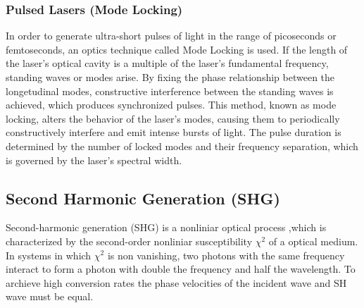 \subsubsection{Pulsed Lasers (Mode Locking)}
    In order to generate ultra-short pulses of light in the range of picoseconds or femtoseconds, an optics technique called Mode Locking is used.
If the length of the laser's optical cavity is a multiple of the laser's fundamental frequency, standing waves or modes arise.
By fixing the phase relationship between the longetudinal modes, constructive interference between the standing waves is achieved, which produces synchronized pulses.
This method, known as mode locking, alters the behavior of the laser's modes, causing them to periodically constructively interfere and emit intense bursts of light.
The pulse duration is determined by the number of locked modes and their frequency separation, which is governed by the laser's spectral width.
    
\subsection{Second Harmonic Generation (SHG)}
    Second-harmonic generation (SHG) is a nonliniar optical process ,which is characterized by the second-order nonliniar susceptibility $\chi^{2}$ of a optical medium.
    In systems in which $\chi^{2}$ is non vanishing, two photons with the same frequency interact to form a photon with double the frequency and half the wavelength.
    To archieve high conversion rates the phase velocities of the incident wave and SH wave must be equal. \cite{demtroder2014laser}
     
